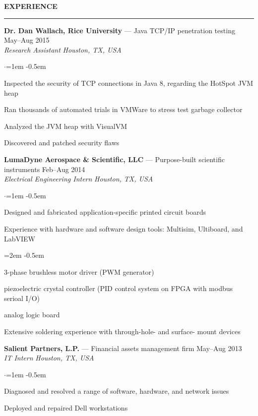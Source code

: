 \documentclass[10pt, a4paper]{article}
\newenvironment{aSection}[1]{
    \medskip \textbf{\uppercase{#1}}
    \smallskip
    \hrule
    \begin{list}{}{
            \setlength{\leftmargin}{1.5em}
        }
    \item[]
    }{
    \end{list}
}
\newenvironment{expSubsection}[4]{
    {#1} \hfill {#2} \\
    \textit{#3} \hfill \textit{#4}
    \smallskip
    \begin{list}{$\cdot$}{\leftmargin=1em}
    \itemsep -0.5em \vspace{-0.5em}
    }{
    \end{list}
    \vspace{0.5em}
}
\newenvironment{subList}{
    \begin{list}{\raisebox{.4ex}{\tiny$\succ$}}{\leftmargin=2em}
    \itemsep -0.5em \vspace{-0.5em}
    }{
    \end{list}
}
\begin{document}
\begin{aSection}{Experience}
    \begin{expSubsection}
        {\textbf{Dr. Dan Wallach, Rice University} --- Java TCP/IP penetration testing}
        {May--Aug 2015}
        {Research Assistant}
        {Houston, TX, USA}
    \item Inspected the security of TCP connections in Java 8, regarding the HotSpot JVM heap
    \item Ran thousands of automated trials in VMWare to stress test garbage collector
    \item Analyzed the JVM heap with VisualVM
    \item Discovered and patched security flaws
    \end{expSubsection}

    \begin{expSubsection}
        {\textbf{LumaDyne Aerospace \& Scientific, LLC} --- Purpose-built scientific
        instruments}
        {Feb--Aug 2014}
        {Electrical Engineering Intern}
        {Houston, TX, USA}
    \item Designed and fabricated application-specific printed circuit boards
    \item Experience with hardware and software design tools: Multisim, Ultiboard, and LabVIEW
        \begin{subList}
            \item 3-phase brushless motor driver (PWM generator)
            \item piezoelectric crystal controller (PID control system on FPGA
                with modbus serioal I/O)
            \item analog logic board
        \end{subList}
    \item Extensive soldering experience with through-hole- and surface-
        mount devices
    \end{expSubsection}

    \begin{expSubsection}
        {\textbf{Salient Partners, L.P.} --- Financial assets management firm}
        {May--Aug 2013}
        {IT Intern}
        {Houston, TX, USA}
    \item Diagnosed and resolved a range of software, hardware, and network issues
    \item Deployed and repaired Dell workstations
    \end{expSubsection}
\end{aSection}
\end{document}
